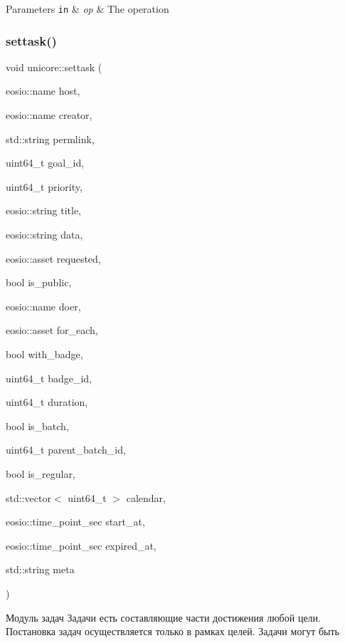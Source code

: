 \begin{DoxyParams}[1]{Parameters}
\mbox{\tt in}  & {\em op} & The operation \\
\hline
\end{DoxyParams}
\mbox{\label{classunicore_aa989f60384b7167e4e1ff2b4d219a1b3}} 
\subsubsection{\texorpdfstring{settask()}{settask()}}
{\footnotesize\ttfamily void unicore\+::settask (\begin{DoxyParamCaption}\item[{eosio\+::name}]{host,  }\item[{eosio\+::name}]{creator,  }\item[{std\+::string}]{permlink,  }\item[{uint64\+\_\+t}]{goal\+\_\+id,  }\item[{uint64\+\_\+t}]{priority,  }\item[{eosio\+::string}]{title,  }\item[{eosio\+::string}]{data,  }\item[{eosio\+::asset}]{requested,  }\item[{bool}]{is\+\_\+public,  }\item[{eosio\+::name}]{doer,  }\item[{eosio\+::asset}]{for\+\_\+each,  }\item[{bool}]{with\+\_\+badge,  }\item[{uint64\+\_\+t}]{badge\+\_\+id,  }\item[{uint64\+\_\+t}]{duration,  }\item[{bool}]{is\+\_\+batch,  }\item[{uint64\+\_\+t}]{parent\+\_\+batch\+\_\+id,  }\item[{bool}]{is\+\_\+regular,  }\item[{std\+::vector$<$ uint64\+\_\+t $>$}]{calendar,  }\item[{eosio\+::time\+\_\+point\+\_\+sec}]{start\+\_\+at,  }\item[{eosio\+::time\+\_\+point\+\_\+sec}]{expired\+\_\+at,  }\item[{std\+::string}]{meta }\end{DoxyParamCaption})}



Модуль задач Задачи есть составляющие части достижения любой цели. Постановка задач осуществляется только в рамках целей. Задачи могут быть 


